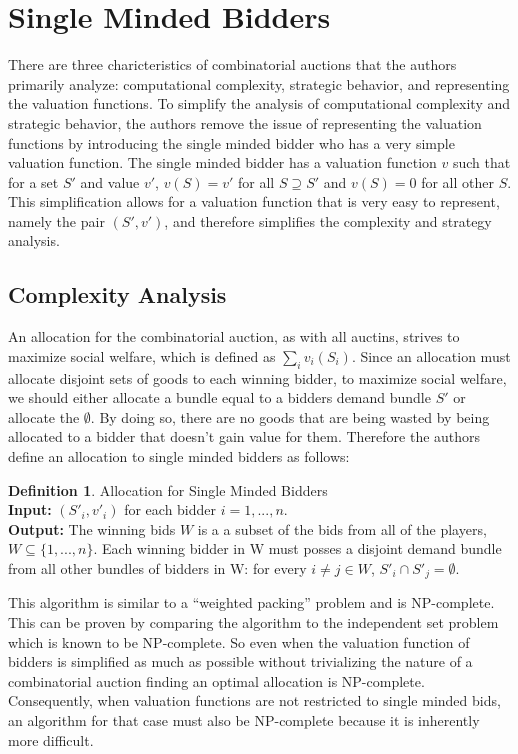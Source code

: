 \documentclass[10pt,onecolumn,letterpaper]{article}
\theoremstyle{definition}
\newtheorem{definition}{Definition}[section]
\begin{document}
\section{Single Minded Bidders} %

There are three charicteristics of combinatorial auctions that the authors primarily analyze: computational complexity, strategic behavior, and representing the valuation functions. To simplify the analysis of computational complexity and strategic behavior, the authors remove the issue of representing the valuation functions by introducing the single minded bidder who has a very simple valuation function. The single minded bidder has a valuation function $v$ such that for a set $S'$ and value $v'$, $v(S) = v'$ for all $S \supseteq S'$ and $v(S) = 0$ for all other $S$. This simplification allows for a valuation function that is very easy to represent, namely the pair $(S', v')$, and therefore simplifies the complexity and strategy analysis.

\subsection{Complexity Analysis} %
An allocation for the combinatorial auction, as with all auctins, strives to maximize social welfare, which is defined as $\sum_i v_i(S_i)$. Since an allocation must allocate disjoint sets of goods to each winning bidder, to maximize social welfare, we should either allocate a bundle equal to a bidders demand bundle $S'$ or allocate the $\emptyset$. By doing so, there are no goods that are being wasted by being allocated to a bidder that doesn't gain value for them. Therefore the authors define an allocation to single minded bidders as follows:

\theoremstyle{definition}
\begin{definition}{Allocation for Single Minded Bidders}
\\
\textbf{Input:} $(S'_i,v'_i)$ for each bidder $i = 1,...,n$.
\\
\textbf{Output:} The winning bids $W$ is a a subset of the bids from all of the players, $W \subseteq \{1,...,n\}$. Each winning bidder in W must posses a disjoint demand bundle from all other bundles of bidders in W: for every $i \neq j \in W$, $S'_i \cap S'_j = \emptyset$.
\end{definition}

This algorithm is similar to a ``weighted packing'' problem and is NP-complete. This can be proven by comparing the algorithm to the independent set problem which is known to be NP-complete. So even when the valuation function of bidders is simplified as much as possible without trivializing the nature of a combinatorial auction finding an optimal allocation is NP-complete. Consequently, when valuation functions are not restricted to single minded bids, an algorithm for that case must also be NP-complete because it is inherently more difficult. 
\end{document}
